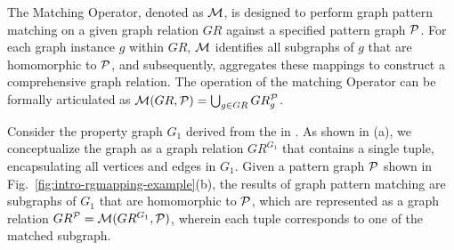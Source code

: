 

\begin{definition}
    \label{def:matching}
    The Matching Operator, denoted as \(\mathcal{M}\), is designed to perform graph pattern matching on a given graph relation \(GR\) against a specified pattern graph \(\mathcal{P}\). For each graph instance \(g\) within \(GR\), \(\mathcal{M}\) identifies all subgraphs of \(g\) that are homomorphic to \(\mathcal{P}\), and subsequently, aggregates these mappings to construct a comprehensive graph relation. The operation of the matching Operator can be formally articulated as \(\mathcal{M}(GR, \mathcal{P}) = \bigcup_{g \in GR} GR_g^{\mathcal{P}}\).%
\end{definition}

\begin{example}
    \label{ex:matching}
    Consider the property graph \(G_1\) derived from the \rgmapping in . As shown in (a), we conceptualize the graph as a graph relation \(GR^{G_1}\) that contains a single tuple, encapsulating all vertices and edges in \(G_1\).
    Given a pattern graph \(\mathcal{P}\) shown in Fig.~\ref{fig:intro-rgmapping-example}(b), the results of graph pattern matching are subgraphs of \(G_1\) that are homomorphic to \(\mathcal{P}\), which are represented as a graph relation \(GR^{\mathcal{P}} = \mathcal{M}(GR^{G_1}, \mathcal{P})\), wherein each tuple corresponds to one of the matched subgraph.
\end{example}

